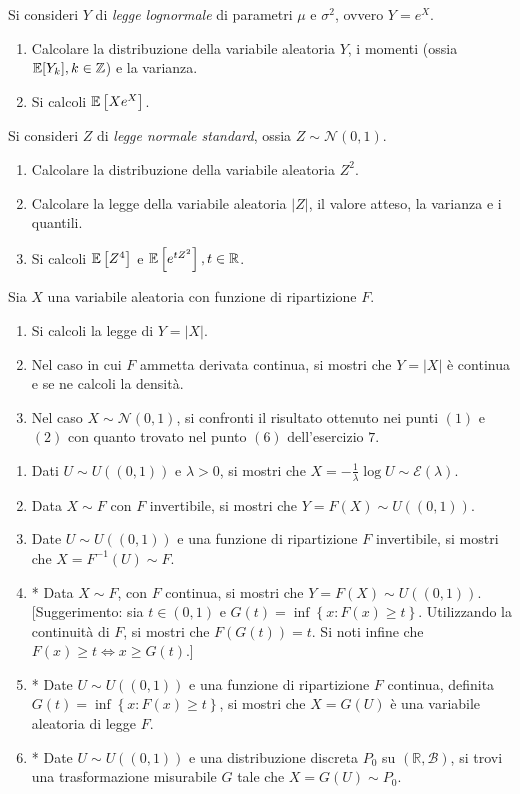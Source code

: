 Si consideri $Y$ di \textit{legge lognormale} di parametri $\mu $ e $\sigma^{2}$, ovvero $Y=e^{X}$.
\begin{enumerate}
\item Calcolare la distribuzione della variabile aleatoria $Y$, i momenti (ossia $\mathbb{E}[Y_{k}] ,k\in \mathbb{Z}$) e la varianza.
\item Si calcoli $\mathbb{E}\left[Xe^{X}\right]$.
\end{enumerate}

Si consideri $Z$ di \textit{legge normale standard}, ossia $Z\sim \mathcal{N}(0,1)$.
\begin{enumerate}
\item Calcolare la distribuzione della variabile aleatoria $Z^{2}$.
\item Calcolare la legge della variabile aleatoria $| Z| $, il valore atteso, la varianza e i quantili.
\item Si calcoli $\mathbb{E}\left[Z^{4}\right]$ e $\mathbb{E}\left[e^{tZ^{2}}\right] ,t\in \mathbb{R}$.
\end{enumerate}
\Esercizio{}

Sia $X$ una variabile aleatoria con funzione di ripartizione $F$.
\begin{enumerate}
\item Si calcoli la legge di $Y=| X| $.
\item Nel caso in cui $F$ ammetta derivata continua, si mostri che $Y=| X| $ è continua e se ne calcoli la densità.
\item Nel caso $X\sim \mathcal{N}(0,1)$, si confronti il risultato ottenuto nei punti $(1)$ e $(2)$ con quanto trovato nel punto $(6)$ dell'esercizio $7$.
\end{enumerate}
\Esercizio{}
\begin{enumerate}
\item Dati $U\sim U((0,1))$ e $\lambda  >0$, si mostri che $X=-\frac{1}{\lambda }\log U\sim \mathcal{E}(\lambda)$.
\item Data $X\sim F$ con $F$ invertibile, si mostri che $Y=F(X) \sim U((0,1))$.
\item Date $U\sim U((0,1))$ e una funzione di ripartizione $F$ invertibile, si mostri che $X=F^{-1}(U) \sim F$.
\item * Data $X\sim F$, con $F$ continua, si mostri che $Y=F(X) \sim U((0,1))$. [Suggerimento: sia $t\in \left(0,1\right)$ e $G\left(t\right) =\inf\left\{x:F\left(x\right) \geq t\right\}$. Utilizzando la continuità di $F$, si mostri che $F\left(G\left(t\right)\right) =t$. Si noti infine che $F\left(x\right) \geq t\iff x\geq G\left(t\right)$.]
\item * Date $U\sim U\left(\left(0,1\right)\right)$ e una funzione di ripartizione $F$ continua, definita $G\left(t\right) =\inf\left\{x:F\left(x\right) \geq t\right\}$, si mostri che $X=G\left(U\right)$ è una variabile aleatoria di legge $F$.
\item * Date $U\sim U((0,1))$ e una distribuzione discreta $P_{0}$ su $\left(\mathbb{R} ,\mathcal{B}\right)$, si trovi una trasformazione misurabile $G$ tale che $X=G\left(U\right) \sim P_{0}$.
\end{enumerate}
